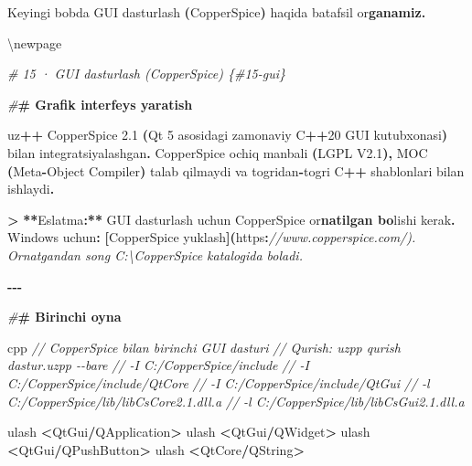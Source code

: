\documentclass[a4paper,11pt,twoside,openright]{book}
\newenvironment{Shaded}{\begin{snugshade}}{\end{snugshade}}
\newcommand{\CharTok}[1]{\textcolor[rgb]{0.31,0.60,0.02}{#1}}
\newcommand{\CommentTok}[1]{\textcolor[rgb]{0.56,0.35,0.01}{\textit{#1}}}
\newcommand{\DecValTok}[1]{\textcolor[rgb]{0.00,0.00,0.81}{#1}}
\newcommand{\ErrorTok}[1]{\textcolor[rgb]{0.64,0.00,0.00}{\textbf{#1}}}
\newcommand{\ExtensionTok}[1]{#1}
\newcommand{\FloatTok}[1]{\textcolor[rgb]{0.00,0.00,0.81}{#1}}
\newcommand{\NormalTok}[1]{#1}
\newcommand{\OperatorTok}[1]{\textcolor[rgb]{0.81,0.36,0.00}{\textbf{#1}}}
\newcommand{\PreprocessorTok}[1]{\textcolor[rgb]{0.56,0.35,0.01}{\textit{#1}}}
\begin{document}
\begin{Shaded}
\begin{Highlighting}[]
\NormalTok{Keyingi bobda GUI dasturlash }\OperatorTok{(}\NormalTok{CopperSpice}\OperatorTok{)}\NormalTok{ haqida batafsil o}\CharTok{\textquotesingle{}r}\ErrorTok{ganamiz.}


\NormalTok{\textbackslash{}newpage}

\PreprocessorTok{\# 15 · GUI dasturlash (CopperSpice) \{\#15{-}gui\}}

\PreprocessorTok{\#}\ErrorTok{\# Grafik interfeys yaratish}

\NormalTok{uz}\OperatorTok{++}\NormalTok{ CopperSpice }\FloatTok{2.1} \OperatorTok{(}\ExtensionTok{Qt} \DecValTok{5}\NormalTok{ asosidagi zamonaviy C}\OperatorTok{++}\DecValTok{20}\NormalTok{ GUI kutubxonasi}\OperatorTok{)}\NormalTok{ bilan integratsiyalashgan}\OperatorTok{.}\NormalTok{ CopperSpice ochiq manbali }\OperatorTok{(}\NormalTok{LGPL V2}\FloatTok{.1}\OperatorTok{),}\NormalTok{ MOC }\OperatorTok{(}\NormalTok{Meta}\OperatorTok{{-}}\NormalTok{Object Compiler}\OperatorTok{)}\NormalTok{ talab qilmaydi va to}\CharTok{\textquotesingle{}g\textquotesingle{}}\NormalTok{ridan}\OperatorTok{{-}}\NormalTok{to}\CharTok{\textquotesingle{}g\textquotesingle{}}\NormalTok{ri C}\OperatorTok{++}\NormalTok{ shablonlari bilan ishlaydi}\OperatorTok{.}

\OperatorTok{\textgreater{}} \OperatorTok{**}\NormalTok{Eslatma}\OperatorTok{:**}\NormalTok{ GUI dasturlash uchun CopperSpice o}\CharTok{\textquotesingle{}r}\ErrorTok{natilgan bo}\CharTok{\textquotesingle{}}\NormalTok{lishi kerak}\OperatorTok{.}\NormalTok{ Windows uchun}\OperatorTok{:} \OperatorTok{[}\NormalTok{CopperSpice yuklash}\OperatorTok{](}\NormalTok{https}\OperatorTok{:}\CommentTok{//www.copperspice.com/). O\textquotesingle{}rnatgandan so\textquotesingle{}ng \textasciigrave{}C:\textbackslash{}CopperSpice\textasciigrave{} katalogida bo\textquotesingle{}ladi.}

\OperatorTok{{-}{-}{-}}

\PreprocessorTok{\#}\ErrorTok{\# Birinchi oyna}

\ErrorTok{\textasciigrave{}\textasciigrave{}\textasciigrave{}}\NormalTok{cpp}
\CommentTok{// CopperSpice bilan birinchi GUI dasturi}
\CommentTok{// Qurish: uzpp qurish dastur.uzpp {-}{-}bare}
\CommentTok{//   {-}I C:/CopperSpice/include}
\CommentTok{//   {-}I C:/CopperSpice/include/QtCore}
\CommentTok{//   {-}I C:/CopperSpice/include/QtGui}
\CommentTok{//   {-}l C:/CopperSpice/lib/libCsCore2.1.dll.a}
\CommentTok{//   {-}l C:/CopperSpice/lib/libCsGui2.1.dll.a}

\NormalTok{ulash }\OperatorTok{\textless{}}\NormalTok{QtGui}\OperatorTok{/}\ExtensionTok{QApplication}\OperatorTok{\textgreater{}}
\NormalTok{ulash }\OperatorTok{\textless{}}\NormalTok{QtGui}\OperatorTok{/}\ExtensionTok{QWidget}\OperatorTok{\textgreater{}}
\NormalTok{ulash }\OperatorTok{\textless{}}\NormalTok{QtGui}\OperatorTok{/}\ExtensionTok{QPushButton}\OperatorTok{\textgreater{}}
\NormalTok{ulash }\OperatorTok{\textless{}}\NormalTok{QtCore}\OperatorTok{/}\ExtensionTok{QString}\OperatorTok{\textgreater{}}


\end{Highlighting}
\end{Shaded}
\end{document}
